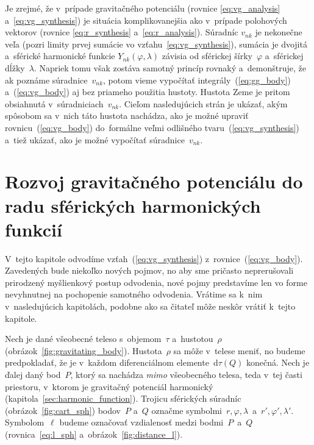 \documentclass[a4paper, 12pt]{book}
\newcommand{\diff}{\mathrm d}
\begin{document}
Je zrejmé, že v~prípade gravitačného potenciálu (rovnice \ref{eq:vg_analysis}
a~\ref{eq:vg_synthesis}) je situácia komplikovanejšia ako v~prípade polohových
vektorov (rovnice \ref{eq:r_synthesis} a~\ref{eq:r_analysis}).  Súradníc
$v_{nk}$ je nekonečne veľa (pozri limity prvej sumácie vo
vzťahu~\ref{eq:vg_synthesis}), sumácia je dvojitá a~sférické harmonické funkcie
$Y_{nk}(\varphi, \lambda)$ závisia od sférickej šírky~$\varphi$ a~sférickej
dĺžky~$\lambda$.  Napriek tomu však zostáva samotný princíp rovnaký 
a~demonštruje, že ak poznáme súradnice~$v_{nk}$, potom vieme vypočítať 
integrály~(\ref{eq:gg_body}) a~(\ref{eq:vg_body}) aj bez
priameho použitia hustoty.  Hustota Zeme je pritom obsiahnutá 
v~súradniciach~$v_{nk}$.  Cieľom nasledujúcich strán je ukázať, akým spôsobom 
sa v~nich táto hustota nachádza, ako je možné upraviť 
rovnicu~(\ref{eq:vg_body}) do~formálne veľmi odlišného 
tvaru~(\ref{eq:vg_synthesis}) a~tiež ukázať, ako je možné vypočítať 
súradnice~$v_{nk}$.



\section{Rozvoj gravitačného potenciálu do radu sférických harmonických
funkcií}
\label{sec:vg_sh_expansion}

V~tejto kapitole odvodíme vzťah~(\ref{eq:vg_synthesis})
z~rovnice~(\ref{eq:vg_body}).  Zavedených bude niekoľko nových pojmov, no aby 
sme pričasto neprerušovali prirodzený myšlienkový postup odvodenia, nové pojmy
predstavíme len vo forme nevyhnutnej na pochopenie samotného odvodenia.
Vrátime sa k~nim v~nasledujúcich kapitolách, podobne ako sa čitateľ môže neskôr 
vrátiť k~tejto kapitole.

Nech je dané všeobecné teleso s~objemom~$\tau$ a~hustotou~$\rho$
(obrázok~\ref{fig:gravitating_body}).  Hustota~$\rho$ sa môže v~telese meniť,
no budeme predpokladať, že je v~každom diferenciálnom elemente~$\diff \tau(Q)$ 
konečná.  Nech je ďalej daný bod~$P$, ktorý sa nachádza \emph{mimo} všeobecného 
telesa, teda v~tej časti priestoru, v~ktorom je gravitačný potenciál harmonický 
(kapitola~\ref{sec:harmonic_function}).  Trojicu sférických súradníc 
(obrázok~\ref{fig:cart_sph}) bodov~$P$ a~$Q$ označme symbolmi~$r, \varphi,
\lambda$~a~$r', \varphi', \lambda'$.  Symbolom~$\ell$ budeme označovať 
vzdialenosť medzi bodmi~$P$~a~$Q$ (rovnica~\ref{eq:l_sph} 
a~obrázok~\ref{fig:distance_l}).
\end{document}
